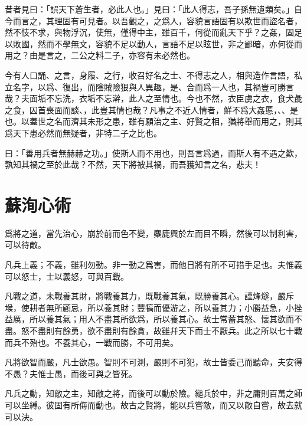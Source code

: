 昔者見曰：「誤天下蒼生者，必此人也。」見曰：「此人得志，吾子孫無遺類矣。」自今而言之，其理固有可見者。以吾觀之，之爲人，容貌言語固有以欺世而盜名者，然不忮不求，與物浮沉，使無，僅得中主，雖百千，何從而亂天下乎？之姦，固足以敗國，然而不學無文，容貌不足以動人，言語不足以眩世，非之鄙暗，亦何從而用之？由是言之，二公之料二子，亦容有未必然也。

今有人口誦、之言，身履、之行，收召好名之士、不得志之人，相與造作言語，私立名字，以爲、復出，而陰賊險狠與人異趣，是、合而爲一人也，其禍豈可勝言哉？夫面垢不忘洗，衣垢不忘澣，此人之至情也。今也不然，衣臣虜之衣，食犬彘之食，囚首喪面而談、，此豈其情也哉？凡事之不近人情者，鮮不爲大姦慝，、、是也。以蓋世之名而濟其未形之患，雖有願治之主、好賢之相，猶將舉而用之，則其爲天下患必然而無疑者，非特二子之比也。

曰：「善用兵者無赫赫之功。」使斯人而不用也，則吾言爲過，而斯人有不遇之歎，孰知其禍之至於此哉？不然，天下將被其禍，而吾獲知言之名，悲夫！

\section[心術\quad{\small 蘇洵}]{{\normalsize 蘇洵}\quad 心術}
爲將之道，當先治心，崩於前而色不變，麋鹿興於左而目不瞬，然後可以制利害，可以待敵。

凡兵上義；不義，雖利勿動。非一動之爲害，而他日將有所不可措手足也。夫惟義可以怒士，士以義怒，可與百戰。

凡戰之道，未戰養其財，將戰養其力，既戰養其氣，既勝養其心。謹烽燧，嚴斥堠，使耕者無所顧忌，所以養其財；豐犒而優游之，所以養其力；小勝益急，小挫益厲，所以養其氣；用人不盡其所欲爲，所以養其心。故士常蓄其怒、懷其欲而不盡。怒不盡則有餘勇，欲不盡則有餘貪，故雖幷天下而士不厭兵。此之所以七十戰而兵不殆也。不養其心，一戰而勝，不可用矣。

凡將欲智而嚴，凡士欲愚。智則不可測，嚴則不可犯，故士皆委己而聽命，夫安得不愚？夫惟士愚，而後可與之皆死。

凡兵之動，知敵之主，知敵之將，而後可以動於險。縋兵於中，非之庸則百萬之師可以坐縛。彼固有所侮而動也。故古之賢將，能以兵嘗敵，而又以敵自嘗，故去就可以決。

